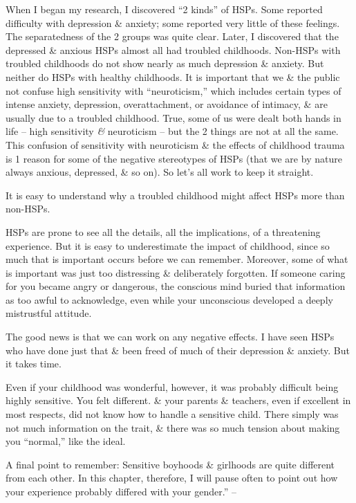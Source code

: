 \documentclass{article}
\numberwithin{equation}{section}
\begin{document}
When I began my research, I discovered ``2 kinds'' of HSPs. Some reported difficulty with depression \& anxiety; some reported very little of these feelings. The separatedness of the 2 groups was quite clear. Later, I discovered that the depressed \& anxious HSPs almost all had troubled childhoods. Non-HSPs with troubled childhoods do not show nearly as much depression \& anxiety. But neither do HSPs with healthy childhoods. It is important that we \& the public not confuse high sensitivity with ``neuroticism,'' which includes certain types of intense anxiety, depression, overattachment, or avoidance of intimacy, \& are usually due to a troubled childhood. True, some of us were dealt both hands in life -- high sensitivity {\it\&} neuroticism -- but the 2 things are not at all the same. This confusion of sensitivity with neuroticism \& the effects of childhood trauma is 1 reason for some of the negative stereotypes of HSPs (that we are by nature always anxious, depressed, \& so on). So let's all work to keep it straight.

It is easy to understand why a troubled childhood might affect HSPs more than non-HSPs.

HSPs are prone to see all the details, all the implications, of a threatening experience. But it is easy to underestimate the impact of childhood, since so much that is important occurs before we can remember. Moreover, some of what is important was just too distressing \& deliberately forgotten. If someone caring for you became angry or dangerous, the conscious mind buried that information as too awful to acknowledge, even while your unconscious developed a deeply mistrustful attitude.

The good news is that we can work on any negative effects. I have seen HSPs who have done just that \& been freed of much of their depression \& anxiety. But it takes time.

Even if your childhood was wonderful, however, it was probably difficult being highly sensitive. You felt different. \& your parents \& teachers, even if excellent in most respects, did not know how to handle a sensitive child. There simply was not much information on the trait, \& there was so much tension about making you ``normal,'' like the ideal.

A final point to remember: Sensitive boyhoods \& girlhoods are quite different from each other. In this chapter, therefore, I will pause often to point out how your experience probably differed with your gender.'' -- \cite[pp. 99--100]{Aron2013}
\end{document}
